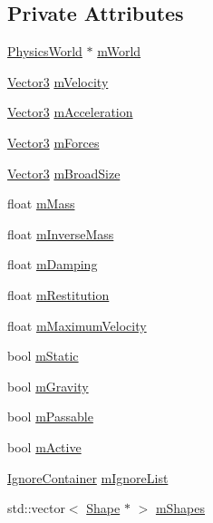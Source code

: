 \subsection*{Private Attributes}
\begin{DoxyCompactItemize}
\item 
\hyperlink{classPhysicsWorld}{Physics\+World} $\ast$ \hyperlink{classPhysicsObject_a020b80e399784584c4d698c2f1cbd73b}{m\+World}
\item 
\hyperlink{structVector3}{Vector3} \hyperlink{classPhysicsObject_a1465f4ecf33500797facd00672ddb2b8}{m\+Velocity}
\item 
\hyperlink{structVector3}{Vector3} \hyperlink{classPhysicsObject_a9ac61c4302d4baf019ca2764f34e6493}{m\+Acceleration}
\item 
\hyperlink{structVector3}{Vector3} \hyperlink{classPhysicsObject_a530940066b7c62217575e8fa71ebce51}{m\+Forces}
\item 
\hyperlink{structVector3}{Vector3} \hyperlink{classPhysicsObject_ad4d4fefcb37be640f28f17cef046c0ed}{m\+Broad\+Size}
\item 
float \hyperlink{classPhysicsObject_a996b10a905c08ba1dd93dd4cff5c0158}{m\+Mass}
\item 
float \hyperlink{classPhysicsObject_ae28c1c3be39dd036b5163d7a92488f06}{m\+Inverse\+Mass}
\item 
float \hyperlink{classPhysicsObject_a74fc2ce33342515768f9a60505993eae}{m\+Damping}
\item 
float \hyperlink{classPhysicsObject_a7e9c3cda294db87d0eb0138eaa90c270}{m\+Restitution}
\item 
float \hyperlink{classPhysicsObject_a028e935d71516b93e565eab1f9a272da}{m\+Maximum\+Velocity}
\item 
bool \hyperlink{classPhysicsObject_a293534176610812f9f6b54a7619d9ab8}{m\+Static}
\item 
bool \hyperlink{classPhysicsObject_a67801f870ad67d0a4845f5a95c196de4}{m\+Gravity}
\item 
bool \hyperlink{classPhysicsObject_a3d3fbea708e07f5c6c6bd19fe5504692}{m\+Passable}
\item 
bool \hyperlink{classPhysicsObject_a0fc8e4a8f154c41f61a1e1fea88cee27}{m\+Active}
\item 
\hyperlink{classPhysicsObject_a5ab17c11089e18df5c34651dbad8903a}{Ignore\+Container} \hyperlink{classPhysicsObject_a5247997669f7885886a966f99079d758}{m\+Ignore\+List}
\item 
std\+::vector$<$ \hyperlink{structShape}{Shape} $\ast$ $>$ \hyperlink{classPhysicsObject_abb2b870bf15b8eca1a7f543324dccaee}{m\+Shapes}
\end{DoxyCompactItemize}
